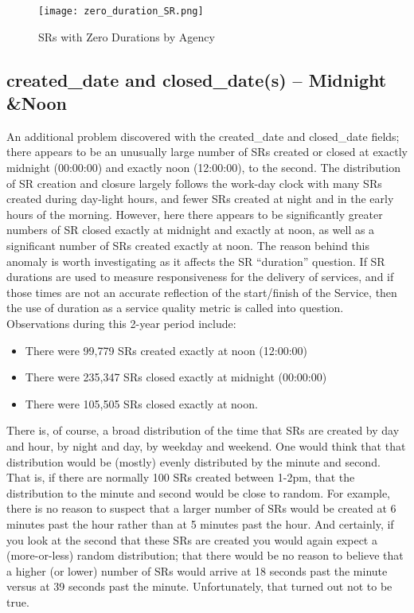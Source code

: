 \documentclass[12pt, titlepage]{article}
\begin{document}
{	\begin{figure}[H]
		 \centering
		 \texttt{[image: zero\_duration\_SR.png]}
		 \caption{SRs with Zero Durations by Agency}
		 \label{fig:sero-duration}
	\end{figure}	
		
	\subsection{created\_date and closed\_date(s) -- Midnight \&Noon}
	An additional problem discovered with the created\_date and closed\_date fields; there appears to be an unusually large number of 
	SRs created or closed at exactly midnight (00:00:00) and exactly noon (12:00:00), to the second. The distribution of SR creation and closure 
	largely follows the work-day clock with many SRs created during day-light hours, and fewer SRs 
	created at night and in the early hours of the morning. 
	However, here there appears to be significantly greater numbers of SR closed exactly at midnight and exactly at noon,
	as well as a significant number of SRs created exactly at noon. The reason behind this anomaly is worth investigating 
	as it affects the SR ``duration'' question. If SR durations are used to measure responsiveness
	for the delivery of services, and if those times are not an accurate reflection of the start/finish of the Service, then the use of
	duration as a service quality metric is called into question. Observations during this 2-year period include:
	
	\begin{itemize}
		    \item There were 99,779 SRs created exactly at noon (12:00:00)
		    \item There were 235,347 SRs closed exactly at midnight (00:00:00)
		    \item There were 105,505 SRs closed exactly at noon. 
	\end{itemize}
	
	There is, of course, a broad distribution of the time that SRs are created by day and hour, by night and day, by weekday and weekend. 
	One would think that that distribution would be (mostly) evenly distributed by the minute and second. That is, 
	if there are normally 100 SRs created between 1-2pm, that the distribution to the minute and second 
	would be close to random. For example, there is no reason to suspect that a larger number of SRs would be 
	created at 6 minutes past the hour rather than at 5 minutes past the hour. And certainly, if you look at the second that these SRs
	are created you would again expect a (more-or-less) random distribution; that there would be no reason to believe 
	that a higher (or lower) number of SRs would arrive at 18 seconds past the minute versus at 39 seconds past the minute.
	Unfortunately, that turned out not to be true.
	
}
\end{document}
